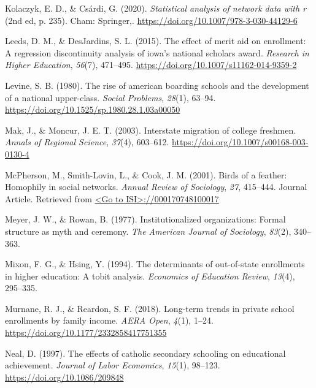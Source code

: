\documentclass[
  12pt,
]{article}
\newlength{\cslhangindent}
\newlength{\cslentryspacingunit} %
\newenvironment{CSLReferences}[2] %
 {%
  \setlength{\parindent}{0pt}
  \ifodd #1
  \let\oldpar\par
  \def\par{\hangindent=\cslhangindent\oldpar}
  \fi
  \setlength{\parskip}{#2\cslentryspacingunit}
 }%
 {}
\begin{document}
\begin{CSLReferences}{1}{0}
\leavevmode{}%
Kolaczyk, E. D., \& Csárdi, G. (2020). \emph{Statistical analysis of network data with r} (2nd ed, p. 235). Cham: Springer,. \url{https://doi.org/10.1007/978-3-030-44129-6}

\leavevmode{}%
Leeds, D. M., \& DesJardins, S. L. (2015). The effect of merit aid on enrollment: A regression discontinuity analysis of iowa's national scholars award. \emph{Research in Higher Education}, \emph{56}(7), 471--495. \url{https://doi.org/10.1007/s11162-014-9359-2}

\leavevmode{}%
Levine, S. B. (1980). The rise of american boarding schools and the development of a national upper-class. \emph{Social Problems}, \emph{28}(1), 63--94. \url{https://doi.org/10.1525/sp.1980.28.1.03a00050}

\leavevmode{}%
Mak, J., \& Moncur, J. E. T. (2003). Interstate migration of college freshmen. \emph{Annals of Regional Science}, \emph{37}(4), 603--612. \url{https://doi.org/10.1007/s00168-003-0130-4}

\leavevmode{}%
McPherson, M., Smith-Lovin, L., \& Cook, J. M. (2001). Birds of a feather: Homophily in social networks. \emph{Annual Review of Sociology}, \emph{27}, 415--444. Journal Article. Retrieved from \href{\%3CGo\%20to\%20ISI\%3E://000170748100017}{\textless Go to ISI\textgreater://000170748100017}

\leavevmode{}%
Meyer, J. W., \& Rowan, B. (1977). Institutionalized organizations: Formal structure as myth and ceremony. \emph{The American Journal of Sociology}, \emph{83}(2), 340--363.

\leavevmode{}%
Mixon, F. G., \& Hsing, Y. (1994). The determinants of out-of-state enrollments in higher education: A tobit analysis. \emph{Economics of Education Review}, \emph{13}(4), 295--335.

\leavevmode{}%
Murnane, R. J., \& Reardon, S. F. (2018). Long-term trends in private school enrollments by family income. \emph{AERA Open}, \emph{4}(1), 1--24. \url{https://doi.org/10.1177/2332858417751355}

\leavevmode{}%
Neal, D. (1997). The effects of catholic secondary schooling on educational achievement. \emph{Journal of Labor Economics}, \emph{15}(1), 98--123. \url{https://doi.org/10.1086/209848}


\end{CSLReferences}
\end{document}
